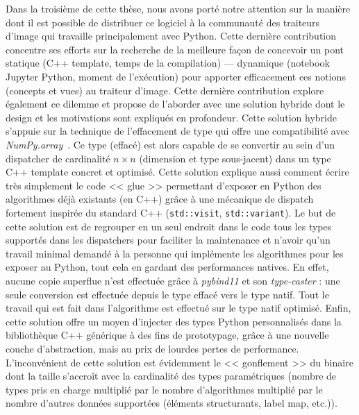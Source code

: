 Dans la troisième de cette thèse, nous avons porté notre attention sur la manière dont il est possible de distribuer ce
logiciel à la communauté des traiteurs d'image qui travaille principalement avec Python. Cette dernière contribution
concentre ses efforts sur la recherche de la meilleure façon de concevoir un pont statique (C++ template, temps de la
compilation) --- dynamique (notebook Jupyter Python, moment de l'exécution) pour apporter efficacement ces notions
(concepts et vues) au traiteur d'image. Cette dernière contribution explore également ce dilemme et propose de l'aborder
avec une solution hybride dont le design et les motivations sont expliqués en profondeur. Cette solution hybride
s'appuie sur la technique de l'effacement de type qui offre une compatibilité avec
\emph{NumPy.array}~\parencite{harris.2020.numpy}. Ce type (effacé) est alors capable de se convertir au sein d'un
dispatcher de cardinalité \(n \times n\) (dimension et type sous-jacent) dans un type C++ template concret et optimisé.
Cette solution explique aussi comment écrire très simplement le code << glue >> permettant d'exposer en Python des
algorithmes déjà existants (en C++) grâce à une mécanique de dispatch fortement inspirée du standard C++
(\texttt{std::visit}, \texttt{std::variant}). Le but de cette solution est de regrouper en un seul endroit dans le code
tous les types supportés dans les dispatchers pour faciliter la maintenance et n'avoir qu'un travail minimal demandé à
la personne qui implémente les algorithmes pour les exposer au Python, tout cela en gardant des performances natives. En
effet, aucune copie superflue n'est effectuée grâce à \emph{pybind11} et son \emph{type-caster} : une seule conversion
est effectuée depuis le type effacé vers le type natif. Tout le travail qui est fait dans l'algorithme est effectué sur
le type natif optimisé. Enfin, cette solution offre un moyen d'injecter des types Python personnalis\'{e}s dans la
bibliothèque C++ générique à des fins de prototypage, grâce à une nouvelle couche d'abstraction, mais au prix de lourdes
pertes de performance. L'inconvénient de cette solution est évidemment le << gonflement >> du binaire dont la taille
s'accroît avec la cardinalité des types paramétriques (nombre de types pris en charge multiplié par le nombre
d'algorithmes multiplié par le nombre d'autres données supportées (éléments structurants, label map, etc.)).


